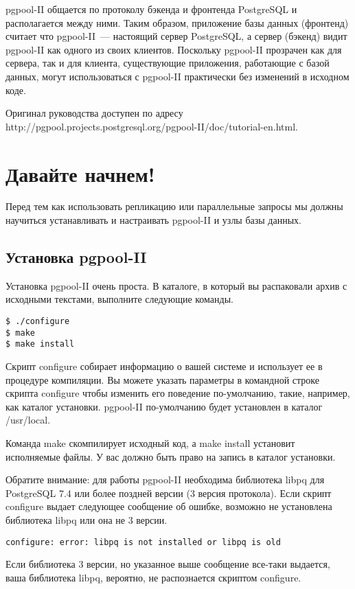 pgpool-II общается по протоколу бэкенда и фронтенда PostgreSQL и располагается между ними. 
Таким образом, приложение базы данных (фронтенд) считает что pgpool-II~--- настоящий сервер PostgreSQL, а сервер (бэкенд) 
видит pgpool-II как одного из своих клиентов. Поскольку pgpool-II прозрачен как для сервера, так и для клиента, 
существующие приложения, работающие с базой данных, могут использоваться с pgpool-II практически без изменений в исходном коде.

Оригинал руководства доступен по адресу http://pgpool.projects.postgresql.org/pgpool-II/doc/tutorial-en.html.

\section{Давайте начнем!}
\label{sec:pgpool-II-begin}
Перед тем как использовать репликацию или параллельные запросы мы должны научиться устанавливать и настраивать pgpool-II 
и узлы базы данных.

\subsection{Установка pgpool-II}
Установка pgpool-II очень проста. В каталоге, в который вы распаковали архив 
с исходными текстами, выполните следующие команды.
\begin{verbatim}
$ ./configure
$ make
$ make install
\end{verbatim}

Скрипт configure собирает информацию о вашей системе и использует ее в процедуре компиляции. Вы можете 
указать параметры в командной строке скрипта configure чтобы изменить его поведение по-умолчанию, такие, например, 
как каталог установки. pgpool-II по-умолчанию будет установлен в каталог /usr/local.

Команда make скомпилирует исходный код, а make install установит исполняемые файлы. У вас должно быть право на 
запись в каталог установки.

Обратите внимание: для работы pgpool-II необходима библиотека libpq для PostgreSQL 7.4 или более поздней версии (3 версия протокола).
Если скрипт configure выдает следующее сообщение об ошибке, возможно не установлена библиотека libpq или она не 3 версии.
\begin{verbatim}
configure: error: libpq is not installed or libpq is old
\end{verbatim}

Если библиотека 3 версии, но указанное выше сообщение все-таки выдается, ваша библиотека libpq, вероятно, 
не распознается скриптом configure.

